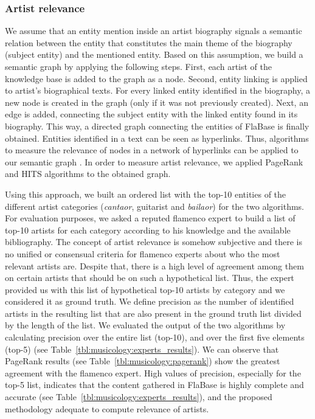 \subsubsection{Artist relevance}
\label{sec:musicology:relevance}

We assume that an entity mention inside an artist biography signals a semantic relation between the entity that constitutes the main theme of the biography (subject entity) and the mentioned entity. Based on this assumption, we build a semantic graph by applying the following steps. First, each artist of the knowledge base is added to the graph as a node. Second, entity linking is applied to artist's biographical texts. For every linked entity identified in the biography, a new node is created in the graph (only if it was not previously created). Next, an edge is added, connecting the subject entity with the linked entity found in its biography. This way, a directed graph connecting the entities of FlaBase is finally obtained. Entities identified in a text can be seen as hyperlinks. Thus, algorithms to measure the relevance of nodes in a network of hyperlinks can be applied to our semantic graph \citep{Bellomi2005}. In order to measure artist relevance, we applied PageRank \citep{Brin1998} and HITS \citep{Kleinberg1999} algorithms to the obtained graph. 

Using this approach, we built an ordered list with the top-10 entities of the different artist categories (\textit{cantaor}, guitarist and \textit{bailaor}) for the two algorithms. For evaluation purposes, we asked a reputed flamenco expert to build a list of top-10 artists for each category according to his knowledge and the available bibliography. The concept of artist relevance is somehow subjective and there is no unified or consensual criteria for flamenco experts about who the most relevant artists are. Despite that, there is a high level of agreement among them on certain artists that should be on such a hypothetical list. Thus, the expert provided us with this list of hypothetical top-10 artists by category and we considered it as ground truth. We define precision as the number of identified artists in the resulting list that are also present in the ground truth list divided by the length of the list. We evaluated the output of the two algorithms by calculating precision over the entire list (top-10), and over the first five elements (top-5) (see Table~\ref{tbl:musicology:experts_results}). We can observe that Page\-Rank results (see Table~\ref{tbl:musicology:pagerank}) show the greatest agreement with the flamenco expert. 
High values of precision, especially for the top-5 list, indicates that the content gathered in FlaBase is highly complete and accurate (see Table~\ref{tbl:musicology:experts_results}), and the proposed methodology adequate to compute relevance of artists. 

